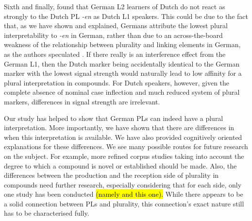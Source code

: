 Sixth and finally, \textcite{BangaEa2013a} found that German L2 learners of Dutch do not react as strongly to the Dutch PL \textit{-en} as Dutch L1 speakers.
This could be due to the fact that, as we have shown and explained, Germans attribute the lowest plural interpretability to \textit{-en} in German, rather than due to an across-the-board weakness of the relationship between plurality and linking elements in German, as the authors speculated \parencite[45]{BangaEa2013a}.
If there really is an interference effect from the German L1, then the Dutch marker being accidentally identical to the German marker with the lowest signal strength would naturally lead to low affinity for a plural interpretation in compounds.
For Dutch speakers, however, given the complete absence of nominal case inflection and much reduced system of plural markers, differences in signal strength are irrelevant.

Our study has helped to show that German PLs can indeed have a plural interpretation.
More importantly, we have shown that there are differences in when this interpretation is available.
We have also provided cognitively oriented explanations for these differences.
We see many possible routes for future research on the subject.
For example, more refined corpus studies taking into account the degree to which a compound is novel or established should be made.
Also, the differences between the production and the reception side of plurality in compounds need further research, especially considering that for each side, only one study has been conducted \hl{(namely \citealt{KoesterEa2004} and this one).}
While there appears to be a solid connection between PLs and plurality, this connection's exact nature still has to be characterised fully.
